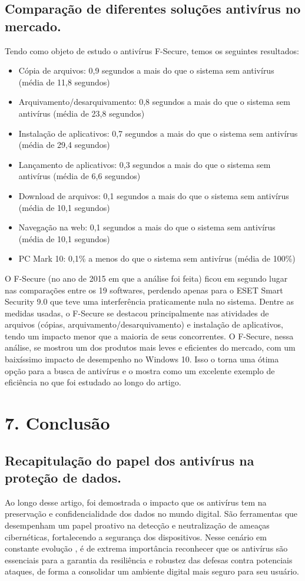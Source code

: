 \documentclass[10pt,conference,twocolumn]{article}
\begin{document}
\subsection* {Comparação de diferentes soluções antivírus no mercado.}
Tendo como objeto de estudo o antivírus F-Secure, temos os seguintes resultados:
\begin{itemize}
\item
Cópia de arquivos: 0,9 segundos a mais do que o sistema sem antivírus (média de 11,8 segundos)
\item
Arquivamento/desarquivamento: 0,8 segundos a mais do que o sistema sem antivírus (média de 23,8 segundos)
\item
Instalação de aplicativos: 0,7 segundos a mais do que o sistema sem antivírus (média de 29,4 segundos)
\item
Lançamento de aplicativos: 0,3 segundos a mais do que o sistema sem antivírus (média de 6,6 segundos)
\item
Download de arquivos: 0,1 segundos a mais do que o sistema sem antivírus (média de 10,1 segundos)
\item
Navegação na web: 0,1 segundos a mais do que o sistema sem antivírus (média de 10,1 segundos)
\item
PC Mark 10: 0,1\% a menos do que o sistema sem antivírus (média de 100\%)
\end{itemize}
O F-Secure (no ano de 2015 em que a análise foi feita) ficou em segundo lugar nas comparações entre os 19 softwares, perdendo apenas para o ESET Smart Security 9.0 que teve uma interferência praticamente nula no sistema.
Dentre as medidas usadas, o F-Secure se destacou principalmente nas atividades de arquivos (cópias, arquivamento/desarquivamento) e instalação de aplicativos, tendo um impacto menor que a maioria de seus concorrentes.
O F-Secure, nessa análise, se mostrou um dos produtos mais leves e eficientes do mercado, com um baixíssimo impacto de desempenho no Windows 10. Isso o torna uma ótima opção para a busca de antivírus e o mostra como um excelente exemplo de eficiência no que foi estudado ao longo do artigo.

\section* {7. Conclusão}

\subsection*{Recapitulação do papel dos antivírus na proteção de dados.}
Ao longo desse artigo, foi demostrada o impacto que os antivírus tem na preservação e confidencialidade dos dados no mundo digital. São ferramentas que desempenham um papel proativo na detecção e neutralização de ameaças cibernéticas, fortalecendo a segurança dos dispositivos. Nesse cenário em constante evolução , é de extrema importância reconhecer que os antivírus são essenciais para a garantia da resiliência e robustez das defesas contra potenciais ataques, de forma a consolidar um ambiente digital mais seguro para seu usuário.
\end{document}
